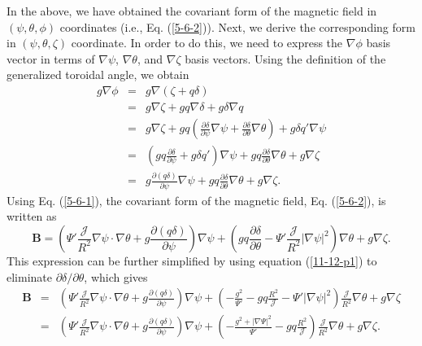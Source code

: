 \documentclass{article}
\begin{document}
In the above, we have obtained the covariant form of the magnetic field in
$(\psi, \theta, \phi)$ coordinates (i.e., Eq. (\ref{5-6-2})). Next, we derive
the corresponding form in $(\psi, \theta, \zeta)$ coordinate. In order to do
this, we need to express the $\nabla \phi$ basis vector in terms of $\nabla
\psi$, $\nabla \theta$, and $\nabla \zeta$ basis vectors. Using the definition
of the generalized toroidal angle, we obtain
\begin{eqnarray}
  g \nabla \phi & = & g \nabla (\zeta + q \delta) \nonumber\\
  & = & g \nabla \zeta + g q \nabla \delta + g \delta \nabla q \nonumber\\
  & = & g \nabla \zeta + g q \left( \frac{\partial \delta}{\partial \psi}
  \nabla \psi + \frac{\partial \delta}{\partial \theta} \nabla \theta \right)
  + g \delta q' \nabla \psi \nonumber\\
  & = & \left( g q \frac{\partial \delta}{\partial \psi} + g \delta q'
  \right) \nabla \psi + g q \frac{\partial \delta}{\partial \theta} \nabla
  \theta + g \nabla \zeta \nonumber\\
  & = & g \frac{\partial (q \delta)}{\partial \psi} \nabla \psi + g q
  \frac{\partial \delta}{\partial \theta} \nabla \theta + g \nabla \zeta . 
  \label{5-6-1}
\end{eqnarray}
Using Eq. (\ref{5-6-1}), the covariant form of the magnetic field, Eq.
(\ref{5-6-2}), is written as
\begin{equation}
  \label{5-9-a1} \mathbf{B}= \left( \Psi' \frac{\mathcal{J}}{R^2} \nabla \psi
  \cdot \nabla \theta + g \frac{\partial (q \delta)}{\partial \psi} \right)
  \nabla \psi + \left( g q \frac{\partial \delta}{\partial \theta} - \Psi'
  \frac{\mathcal{J}}{R^2} | \nabla \psi |^2 \right) \nabla \theta + g \nabla
  \zeta .
\end{equation}
This expression can be further simplified by using equation (\ref{11-12-p1})
to eliminate $\partial \delta / \partial \theta$, which gives
\begin{eqnarray}
  \mathbf{B} & = & \left( \Psi' \frac{\mathcal{J}}{R^2} \nabla \psi \cdot
  \nabla \theta + g \frac{\partial (q \delta)}{\partial \psi} \right) \nabla
  \psi + \left( - \frac{g^2}{\Psi'} - g q \frac{R^2}{\mathcal{J}} - \Psi' |
  \nabla \psi |^2 \right) \frac{\mathcal{J}}{R^2} \nabla \theta + g \nabla
  \zeta \nonumber\\
  & = & \left( \Psi' \frac{\mathcal{J}}{R^2} \nabla \psi \cdot \nabla \theta
  + g \frac{\partial (q \delta)}{\partial \psi} \right) \nabla \psi + \left( -
  \frac{g^2 + | \nabla \Psi |^2}{\Psi'} - g q \frac{R^2}{\mathcal{J}} \right)
  \frac{\mathcal{J}}{R^2} \nabla \theta + g \nabla \zeta . 
\end{eqnarray}
\end{document}
